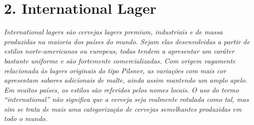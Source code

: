 \section*{2. International Lager}
\textit{International lagers são cervejas lagers premium, industriais e de massa produzidas na maioria dos países do mundo. Sejam elas desenvolvidas a partir de estilos norte-americanos ou europeus, todas tendem a apresentar um caráter bastante uniforme e são fortemente comercializadas. Com origem vagamente relacionada às lagers originais do tipo Pilsner, as variações com mais cor apresentam sabores adicionais de malte, ainda assim mantendo um amplo apelo. Em muitos países, os estilos são referidos pelos nomes locais. O uso do termo “international” não significa que a cerveja seja realmente rotulada como tal, mas sim se trata de mais uma categorização de cervejas semelhantes produzidas em todo o mundo.}
